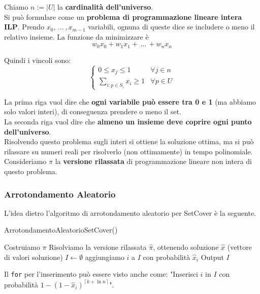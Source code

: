 Chiamo $n:= |U|$ la \textbf{cardinalità dell'universo}.\\

Si può formulare come un \textbf{problema di programmazione lineare intera ILP}. Prendo $x_0, \, \dots \, , x_{m-1}$ variabili, ognuna di queste dice se includere o meno il relativo insieme. La funzione da minimizzare è 
$$ w_0 x_0 + w_1 x_1 + \, \dots \, + w_n x_n $$

Quindi i vincoli sono:
$$ 
\begin{cases}
	0 \leq x_j \leq 1 & \forall j \in n \\
	\sum_{i: p \in S_i} x_i \geq 1  &\forall p \in U
\end{cases}
$$

La prima riga vuol dire che \textbf{ogni variabile può essere tra 0 e 1} (ma abbiamo solo valori interi), di conseguenza prendere o meno il set.\\
La seconda riga vuol dire che \textbf{almeno un insieme deve coprire ogni punto dell'universo}.\\

Risolvendo questo problema sugli interi si ottiene la soluzione ottima, ma si può rilassare su numeri reali per risolverlo (non ottimamente) in tempo polinomiale. Consideriamo $\hat \pi$ la \textbf{versione rilassata} di programmazione lineare non intera di questo problema.\\

\newpage

\subsubsection{Arrotondamento Aleatorio}

L'idea dietro l'algoritmo di arrotondamento aleatorio per SetCover è la seguente.

\begin{algorithm}
	\caption{ArrotondamentoAleatorioSetCover()}
	\begin{algorithmic}
		\STATE Costruiamo $\pi$
		\STATE Risolviamo la versione rilassata $\hat \pi$, ottenendo soluzione $\hat x$ (vettore di valori soluzione)
		\STATE $I \leftarrow \emptyset$
				\STATE aggiungiamo $i$ a $I$ con probabilità $\hat x_i$ 
			\ENDFOR
		\ENDFOR
		\STATE Output $I$
	\end{algorithmic}
\end{algorithm}

Il \texttt{for} per l'inserimento può essere visto anche come: "Inserisci $i$ in $I$ con probabilità $1 - (1-\hat x_i)^{\left\lceil k + \ln n \right\rceil}$".\\

